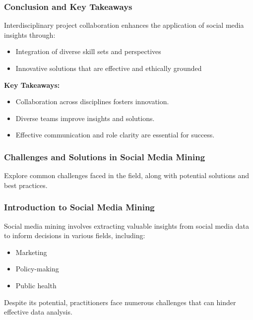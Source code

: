 \documentclass{beamer}
\begin{document}
\begin{frame}[fragile]
    \frametitle{Conclusion and Key Takeaways}
    Interdisciplinary project collaboration enhances the application of social media insights through:
    \begin{itemize}
        \item Integration of diverse skill sets and perspectives
        \item Innovative solutions that are effective and ethically grounded
    \end{itemize}

    \textbf{Key Takeaways:}
    \begin{itemize}
        \item Collaboration across disciplines fosters innovation.
        \item Diverse teams improve insights and solutions.
        \item Effective communication and role clarity are essential for success.
    \end{itemize}
\end{frame}

\begin{frame}[fragile]
    \frametitle{Challenges and Solutions in Social Media Mining}
    Explore common challenges faced in the field, along with potential solutions and best practices.
\end{frame}

\begin{frame}[fragile]
    \frametitle{Introduction to Social Media Mining}
    Social media mining involves extracting valuable insights from social media data to inform decisions in various fields, including:
    \begin{itemize}
        \item Marketing
        \item Policy-making
        \item Public health
    \end{itemize}
    Despite its potential, practitioners face numerous challenges that can hinder effective data analysis.
\end{frame}
\end{document}
